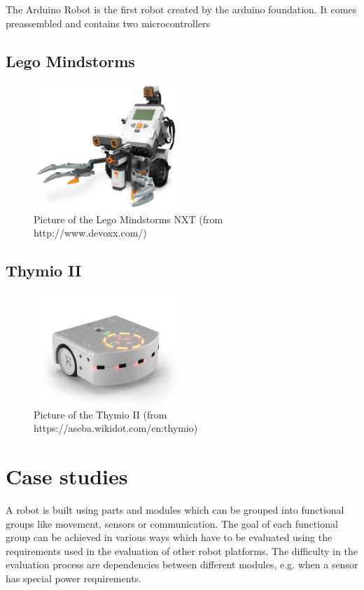 \documentclass[twocolumn]{article}
\begin{document}
The Arduino Robot is the first robot created by the arduino foundation. It comes preassembled and contains two microcontrollers 
\subsection{Lego Mindstorms}
\begin{figure}[h!]
  \centering
  \includegraphics[width=0.5\textwidth]{images/mindstorms.jpg}
  \caption{Picture of the Lego Mindstorms NXT (from http://www.devoxx.com/)}
\end{figure}
\subsection{Thymio II}
\begin{figure}[h!]
  \centering
  \includegraphics[width=0.5\textwidth]{images/thymioii.jpg}
  \caption{Picture of the Thymio II (from https://aseba.wikidot.com/en:thymio)}
\end{figure}


\section{Case studies}
A robot is built using parts and modules which can be grouped into functional groups like movement, sensors or communication. The goal of each functional group can be achieved in various ways which have to be evaluated using the requirements used in the evaluation of other robot platforms. The difficulty in the evaluation process are dependencies between different modules, e.g. when a sensor has special power requirements. 
\end{document}

